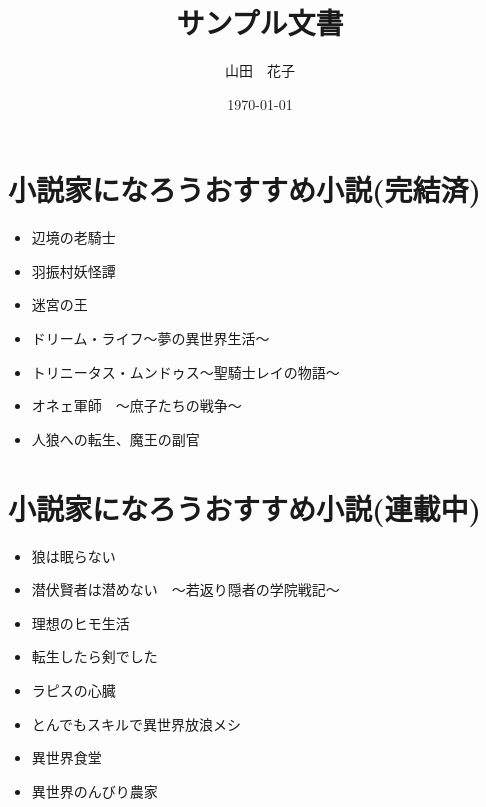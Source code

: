 \documentclass[uplatex]{jsarticle}
\begin{document}
\title{\huge サンプル文書}
\author{山田　花子}
\date{\today}
\maketitle

\section{小説家になろうおすすめ小説(完結済)}
\begin{itemize}
\item 辺境の老騎士
\item 羽振村妖怪譚
\item 迷宮の王
\item ドリーム・ライフ～夢の異世界生活～
\item トリニータス・ムンドゥス～聖騎士レイの物語～
\item オネェ軍師　～庶子たちの戦争～
\item 人狼への転生、魔王の副官
\end{itemize}

\section{小説家になろうおすすめ小説(連載中)}
\begin{itemize}
\item 狼は眠らない
\item 潜伏賢者は潜めない　～若返り隠者の学院戦記～
\item 理想のヒモ生活
\item 転生したら剣でした
\item ラピスの心臓
\item とんでもスキルで異世界放浪メシ
\item 異世界食堂
\item 異世界のんびり農家
\end{itemize}
\end{document}
